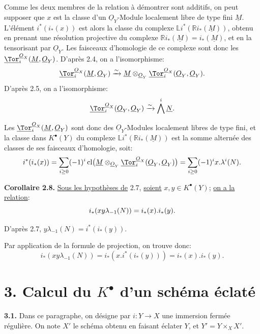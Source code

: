 
Comme les deux membres de la relation à démontrer sont additifs, on peut supposer que \(x\) est la classe d'un \(\underline{O}_Y\)-Module localement libre de type fini \(\underline{M}\). L'élément \(i^*(i_*(x))\) est alors la classe du complexe \(\mathbb L i^*(\mathbb Ri_*(\underline{M}))\), obtenu en prenant une résolution projective du complexe \(\mathbb Ri_*(\underline{M})=i_*(\underline{M})\), et en la tensorisant par \(\underline{O}_Y\). Les faisceaux d'homologie de ce complexe sont donc les \(\underline{\Tor}_i^{\underline{O}_X}(\underline{M},\underline{O}_Y)\). D'après 2.4, on a l'isomorphisme:
\[
\underline{\Tor}_i^{\underline{O}_X}(\underline{M},\underline{O}_Y)
\xrightarrow{\sim}
\underline{M}\otimes_{\underline{O}_Y}\underline{\Tor}_i^{\underline{O}_X}(\underline{O}_Y,\underline{O}_Y).
\]
D'après 2.5, on a l'isomorphisme:
\[
\underline{\Tor}_i^{\underline{O}_X}(\underline{O}_Y,\underline{O}_Y)
\xrightarrow{\sim}
\bigwedge^i\underline{N}.
\]

Les \(\underline{\Tor}_i^{\underline{O}_X}(\underline{M},\underline{O}_Y)\) sont donc des \(\underline{O}_Y\)-Modules localement libres de type fini, et la classe dans \(K^{\bullet}(Y)\) du complexe \(\mathbb L i^*(\mathbb Ri_*(\underline{M}))\) est la somme alternée des classes de ses faisceaux d'homologie, soit:
\[
i^*(i_*(x))=\sum_{i\ge0}(-1)^i
\operatorname{cl}\bigl(\underline{M}\otimes_{\underline{O}_Y}\underline{\Tor}_i^{\underline{O}_X}(\underline{O}_Y,\underline{O}_Y)\bigr)
=\sum_{i\ge0}(-1)^i x.\lambda^i(N).
\]

\textbf{Corollaire 2.8.} \uline{Sous les hypothèses de} 2.7, \uline{soient} \(x,y\in K^{\bullet}(Y)\); \uline{on a la relation}:
\begin{equation}\notag
i_*(xy\lambda_{-1}(N))=i_*(x).i_*(y).
\end{equation}

D'après 2.7, \(y\lambda_{-1}(N)=i^*(i_*(y))\).

Par application de la formule de projection, on trouve donc:
\[
i_*(xy\lambda_{-1}(N))
=i_*(x.i^*(i_*(y)))
=i_*(x).i_*(y).
\]

\section*{3. Calcul du \texorpdfstring{$K^{\bullet}$}{K} d'un schéma éclaté}

\textbf{3.1.} Dans ce paragraphe, on désigne par \(i:Y\to X\) une immersion fermée régulière. On note \(X'\) le schéma obtenu en faisant éclater \(Y\), et \(Y'=Y\times_X X'\).
